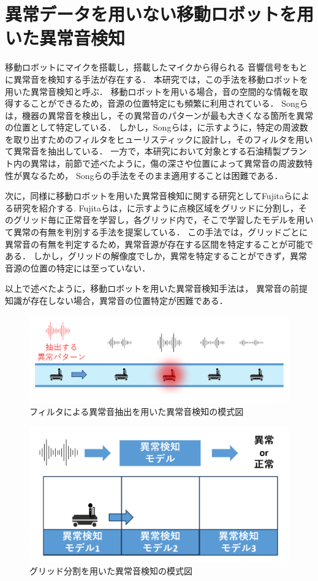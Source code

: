 \documentclass[../main]{subfiles}
\begin{document}
\section{異常データを用いない移動ロボットを用いた異常音検知}
\label{sec:related_work_mobile}

移動ロボットにマイクを搭載し，搭載したマイクから得られる
音響信号をもとに異常音を検知する手法が存在する．
本研究では，この手法を移動ロボットを用いた異常音検知と呼ぶ．
移動ロボットを用いる場合，音の空間的な情報を取得することができるため，音源の位置特定にも頻繁に利用されている．
Songらは，機器の異常音を検出し，その異常音のパターンが最も大きくなる箇所を異常の位置として特定している．\cite{9023943}
しかし，Songらは，に示すように，特定の周波数を取り出すためのフィルタをヒューリスティックに設計し，そのフィルタを用いて異常音を抽出している．
一方で，本研究において対象とする石油精製プラント内の異常は，前節で述べたように，傷の深さや位置によって異常音の周波数特性が異なるため，
Songらの手法をそのまま適用することは困難である．

次に，同様に移動ロボットを用いた異常音検知に関する研究としてFujitaらによる研究を紹介する\cite{10202270}.
Fujitaらは，に示すように点検区域をグリッドに分割し，そのグリッド毎に正常音を学習し，各グリッド内で，そこで学習したモデルを用いて異常の有無を判別する手法を提案している．
この手法では，グリッドごとに異常音の有無を判定するため，異常音源が存在する区間を特定することが可能である．
しかし，グリッドの解像度でしか，異常を特定することができず，異常音源の位置の特定には至っていない．

以上で述べたように，移動ロボットを用いた異常音検知手法は，
異常音の前提知識が存在しない場合，異常音の位置特定が困難である．

\begin{figure}[t]
  \centering
  \includegraphics[keepaspectratio, width=1.0\linewidth]{chap2/supervised_prev_research.png}
  \caption{フィルタによる異常音抽出を用いた異常音検知の模式図}
  \label{fig:supervised_prev_research}
\end{figure}

\begin{figure}[t]
  \centering
  \includegraphics[keepaspectratio, width=1.0\linewidth]{chap2/fujita_previous_research.png}
  \caption{グリッド分割を用いた異常音検知の模式図}
  \label{fig:fujita_previous_research}
\end{figure}
\end{document}
